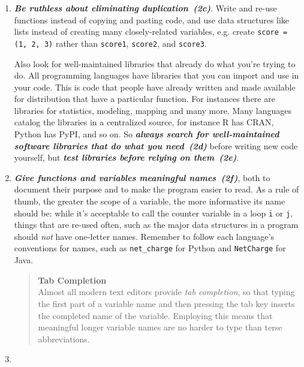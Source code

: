 \documentclass[10pt,letterpaper]{article}
\newcommand{\withurl}[2]{{#1}}
\newcommand{\practice}[2]{\textbf{\emph{{#2}~({#1})}}}
\begin{document}
\begin{enumerate}
\item

  \practice{2c}{Be ruthless about eliminating duplication}. Write and
  re-use functions instead of copying and pasting code, and use data
  structures like lists instead of creating many closely-related
  variables, e.g. create \texttt{score = (1, 2, 3)} rather than
  \texttt{score1}, \texttt{score2}, and \texttt{score3}.

  Also look for well-maintained libraries that already do what you're
  trying to do. All programming languages have libraries that you can
  import and use in your code. This is code that people have already
  written and made available for distribution that have a particular
  function. For instances there are libraries for statistics,
  modeling, mapping and many more. Many languages catalog the
  libraries in a centralized source, for instance R has
  \withurl{CRAN}{https://cran.r-project.org/}, Python has
  \withurl{PyPI}{https://pypi.python.org/}, and so on.  So
  \practice{2d}{always search for well-maintained software libraries
  that do what you need} before writing new code yourself, but
  \practice{2e}{test libraries before relying on them}.

\item

  \practice{2f}{Give functions and variables meaningful names}, both
  to document their purpose and to make the program easier to read. As
  a rule of thumb, the greater the scope of a variable, the more
  informative its name should be: while it's acceptable to call the
  counter variable in a loop \texttt{i} or \texttt{j}, things that are
  re-used often, such as the major data structures in a program should
  \emph{not} have one-letter names.  Remember to follow each
  language's conventions for names, such as \texttt{net\_charge} for
  Python and \texttt{NetCharge} for Java.

  \begin{quote}
    \noindent \textbf{Tab Completion}
    \\
    Almost all modern text editors provide \emph{tab completion}, so
    that typing the first part of a variable name and then pressing
    the tab key inserts the completed name of the variable.  Employing
    this means that meaningful longer variable names are no harder to
    type than terse abbreviations.
  \end{quote}

\item


\end{enumerate}
\end{document}
